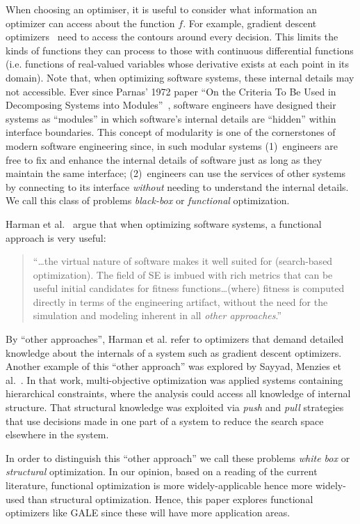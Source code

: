 \documentclass[10pt,journal,compsoc]{IEEEtran}
\begin{document}
When choosing an optimiser, it is useful
 to consider what information
an optimizer can access about the function $f$. 
For example, gradient descent optimizers~\cite{saltelli00} need to  access the contours around every decision.
This limits the kinds of functions they can process
to those with continuous differential functions (i.e. functions of real-valued variables whose derivative exists at each point in its domain).
Note that, when optimizing  software systems, these internal details may not
accessible. 
Ever since Parnas' 1972 paper ``On the Criteria To Be Used in Decomposing Systems into Modules''~\cite{parnas72}, software engineers have designed their systems as ``modules'' in which software's internal details are ``hidden'' within interface boundaries.  
This concept of modularity is one of the cornerstones of modern software engineering since, in such modular systems (1)~engineers are free to fix and enhance the internal details of software just as long as they maintain the same interface;
(2)~engineers can use the services of other systems by connecting to its interface {\em without} needing to understand the internal details.
We call this class
of  problems {\em black-box} or {\em functional} optimization.

Harman et al.~\cite{harman12abc} argue that when optimizing
software systems, a functional approach is very useful:
\begin{quote}
``{\ldots}the virtual nature of software makes it well suited for (search-based optimization). The field of SE is imbued with rich metrics that can be useful initial candidates for fitness functions{\ldots}(where) fitness is computed directly in terms of the engineering artifact, without the need for the simulation and modeling inherent in all {\em other approaches}.''
\end{quote}
By  ``other approaches'', Harman et al. refer to optimizers that demand detailed knowledge  about  the internals of a system
such as gradient descent optimizers.
Another example of this ``other approach'' was explored by
Sayyad, Menzies et al.~\cite{sayyad13a,sayyad13b}.
In that work,
multi-objective optimization was applied  systems containing hierarchical  constraints, where   the analysis could access all knowledge of  internal structure.
That structural knowledge was exploited via {\em push} and {\em pull} strategies that use decisions made in one part of a system to reduce the search space elsewhere in the system. 

In order to distinguish this ``other approach''
we call these  problems {\em white box} or {\em structural}
optimization. In our opinion, based
on a reading of the current literature, functional
optimization is more widely-applicable hence more widely-used than structural optimization. Hence,
this paper explores  functional optimizers like GALE since these will have more application areas.
  
\end{document}
